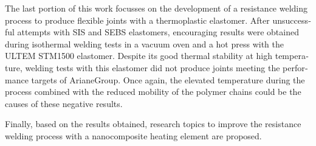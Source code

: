 \begin{otherlanguage}{english}
	The last portion of this work focusses on the development of a resistance welding process to produce flexible joints with a thermoplastic elastomer. 
	After unsuccessful attempts with SIS and SEBS elastomers, encouraging results were obtained during isothermal welding tests in a vacuum oven and a hot press with the ULTEM STM1500 elastomer. 
	Despite its good thermal stability at high temperature, welding tests with this elastomer did not produce joints meeting the performance targets of ArianeGroup. 
	Once again, the elevated temperature during the process combined with the reduced mobility of the polymer chains could be the causes of these negative results. 
	
	Finally, based on the results obtained, research topics to improve the resistance welding process with a nanocomposite heating element are proposed. 
	
\end{otherlanguage}

